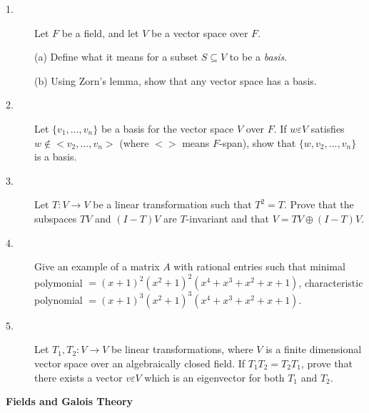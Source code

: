 \documentclass{article}
\begin{document}
\begin{description}
\item[1.]
Let $F$ be a field, and let $V$ be a vector space over $F$.

\item[\quad] (a)
Define what it means for a subset $S \subseteq V$ to be a {\it basis}.

\item[\quad] (b)
Using Zorn's lemma, show that any vector space has a basis.

\item[2.]
Let $\{v_1, \dots, v_n\}$ be a basis for the vector space $V$ over $F$. If
$w \varepsilon V$ satisfies $w \notin < v_2, \dots, v_n>$ (where
$< >$ means $F$-span), show that $\{w, v_2, \dots, v_n\}$ is a basis.

\item[3.]
Let $T:V \to V$ be a linear transformation such that $T^2 = T$.
Prove that the subspaces $TV$ and $(I-T)V$ are $T$-invariant and that
$V=TV \oplus (I-T)V$.

\item[4.]
Give an example of a matrix $A$ with rational entries such that minimal
polymonial $=(x+1)^2 (x^2+1)^2 (x^4+ x^3 + x^2 + x+1)$, characteristic
polynomial $=(x+1)^3(x^2+1)^3(x^4+x^3+x^2+x+1)$.

\item[5.]
Let $T_1, T_2 : V \to V$ be linear transformations, where $V$ is a finite
dimensional vector space over an algebraically closed field. If
$T_1T_2 = T_2T_1$, prove that there exists a vector
$v \varepsilon V$ which is an eigenvector for both $T_1$ and $T_2$.

\end{description}

{\bf Fields and Galois Theory}
\end{document}
